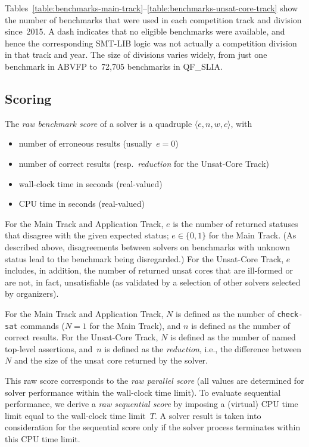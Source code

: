 \documentclass[dvipsnames,table,twoside,11pt]{article}
\newcommand{\maintrack}{Main Track\xspace}
\newcommand{\apptrack}{Application Track\xspace}
\newcommand{\ucoretrack}{Unsat-Core Track\xspace}
\begin{document}
Tables~\ref{table:benchmarks-main-track}--\ref{table:benchmarks-unsat-core-track}
show the number of benchmarks that were used in each competition track
and division since~2015.  A dash indicates that no eligible benchmarks
were available, and hence the corresponding SMT-LIB logic was not
actually a competition division in that track and year.  The size of
divisions varies widely, from just one benchmark in ABVFP to~72,705
benchmarks in QF\_SLIA.

\subsection{Scoring}

The \emph{raw benchmark score} of a solver is a quadruple $\langle
e, n, w, c\rangle$, with
\begin{itemize}[noitemsep]
  \item {} number of erroneous results (usually~$e = 0$)
  \item {} number of correct results (resp.~\emph{reduction} for the \ucoretrack)
  \item {} wall-clock time in seconds (real-valued)
  \item {} CPU time in seconds (real-valued)
\end{itemize}
\noindent
For the \maintrack and \apptrack, $e$ is the number of returned statuses that disagree with the given expected status; $e \in \{0,1\}$ for the \maintrack.  (As described above, disagreements between solvers on benchmarks with unknown status lead to the benchmark being disregarded.)  For the \ucoretrack, $e$ includes, in addition, the number of returned unsat cores that are ill-formed or are not, in fact, unsatisfiable (as validated by a selection of other solvers selected by organizers).

For the \maintrack and \apptrack,
$N$ is defined as the number of {\tt check-sat} commands ($N=1$ for the \maintrack), and
$n$ is defined as the number of correct results.
For the \ucoretrack, $N$ is defined as the number of named top-level assertions,
and~$n$ is defined as the \emph{reduction}, i.e., the difference between $N$
and the size of the unsat core returned by the solver.

This raw score corresponds to the \emph{raw parallel score} (all values are
determined for solver performance within the wall-clock time limit).  To
evaluate sequential performance, we derive a \emph{raw sequential score} by
imposing a (virtual) CPU time limit equal to the wall-clock time limit~$T$.  A
solver result is taken into consideration for the sequential score only if the
solver process terminates within this CPU time limit.
\end{document}
